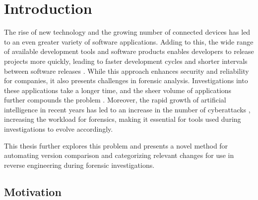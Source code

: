 

\chapter{Introduction}
\label{cha:introduction}

The rise of new technology and the growing number of connected devices has led to an even greater variety of software applications. Adding to this, the wide range of available development tools and software products enables developers to release projects more quickly, leading to faster development cycles and shorter intervals between software releases \cite{ACM_Current_and_Future_Trends_in_Mobile_Device_Forensics_A_Survey}. While this approach enhances security and reliability for companies, it also presents challenges in forensic analysis. Investigations into these applications take a longer time, and the sheer volume of applications further compounds the problem \cite{android_matching, introductionForensics}. Moreover, the rapid growth of artificial intelligence in recent years has led to an increase in the number of cyberattacks \cite{gurtov_3}, increasing the workload for forensics, making it essential for tools used during investigations to evolve accordingly.

This thesis further explores this problem and presents a novel method for automating version comparison and categorizing relevant changes for use in reverse engineering during forensic investigations.

\section{Motivation}
\label{sec:motivation}

